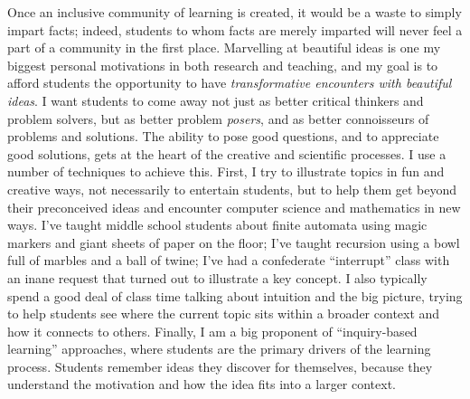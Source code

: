 \documentclass[12pt]{article}
\begin{document}

Once an inclusive community of learning is created, it would be a
waste to simply impart facts; indeed, students to whom facts are
merely imparted will never feel a part of a community in the first
place. Marvelling at beautiful ideas is one my biggest personal
motivations in both research and teaching, and my goal is to afford
students the opportunity to have \emph{transformative encounters with
  beautiful ideas}.  I want students to come away not just as better
critical thinkers and problem solvers, but as better problem
\emph{posers}, and as better connoisseurs of problems and solutions.
The ability to pose good questions, and to appreciate good solutions,
gets at the heart of the creative and scientific processes.  I use a
number of techniques to achieve this.  First, I try to illustrate
topics in fun and creative ways, not necessarily to entertain
students, but to help them get beyond their preconceived ideas and
encounter computer science and mathematics in new ways.  I've taught
middle school students about finite automata using magic markers and
giant sheets of paper on the floor; I've taught recursion using a bowl
full of marbles and a ball of twine; I've had a confederate
``interrupt'' class with an inane request that turned out to
illustrate a key concept.  I also typically spend a good deal of class
time talking about intuition and the big picture, trying to help
students see where the current topic sits within a broader context and
how it connects to others.  Finally, I am a big proponent of
``inquiry-based learning'' approaches, where students are the primary
drivers of the learning process. Students remember ideas they discover
for themselves, because they understand the motivation and how the
idea fits into a larger context.

\end{document}
